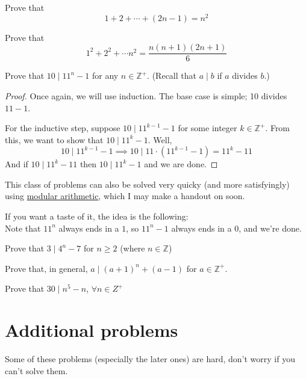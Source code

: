 \documentclass[a4paper]{scrartcl}
\begin{document}
\begin{exercise}
	Prove that 	
	\[1 + 2 + \cdots + \left(2n-1\right) = n^2\]
\end{exercise}

\begin{exercise}
	Prove that
	\[1^2 + 2^2 + \cdots n^2 = \frac{n(n+1)(2n+1)}{6}\]
\end{exercise}


\begin{example}
	Prove that $10 \mid 11^n - 1$ for any $n \in \mathbb{Z}^+$. (Recall that $a \mid b$ if $a$ divides $b$.)
\end{example}
\begin{proof}
	Once again, we will use induction. The base case is simple; 10 divides $11-1$.

	For the inductive step, suppose $10 \mid 11^{k-1} - 1$ for some integer $k \in \mathbb{Z}^+$. From this, we want to show that $10 \mid 11^k - 1$. Well,
	\[10 \mid 11^{k-1} - 1 \implies 10 \mid 11 \cdot (11^{k-1} - 1) = 11^k - 11 \]
	And if $10 \mid 11^k - 11$ then $10 \mid 11^k - 1$ and we are done.

\end{proof}
\begin{remark*}
	This class of problems can also be solved very quicky (and more satisfyingly) using \href{https://brilliant.org/wiki/modular-arithmetic/}{modular arithmetic}, which I may make a handout on soon.

	If you want a taste of it, the idea is the following: \\
	Note that $11^n$ always ends in a $1$, so $11^n - 1$ always ends in a 0, and we're done.
\end{remark*}

\begin{exercise}
	Prove that $3 \mid 4^{n} - 7$ for $n \geq 2$ (where $n \in \mathbb{Z}$)
\end{exercise}

\begin{exercise}
	Prove that, in general, $ a \mid {\left(a+1\right)}^n + \left(a-1\right)$ for $a \in \mathbb{Z}^+$.
\end{exercise}

\begin{exercise}
	Prove that $30 \mid n^5 - n$,  $\forall n \in Z^+$
\end{exercise}


\section{Additional problems}
Some of these problems (especially the later ones) are hard, don't worry if you can't solve them.
\end{document}
